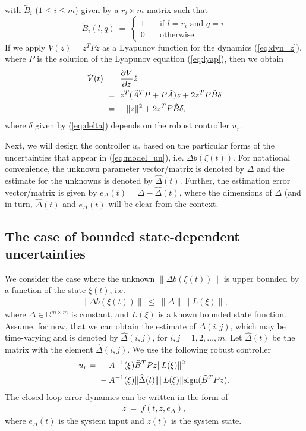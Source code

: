 \documentclass[twoside,leqno,onecolumn]{article}
\begin{document}
with $\tilde B_i$ ($1\leq i\leq m$) given by a $r_i\times m$ matrix such that
\[ \tilde{B}_i(l,q) ~=~ \left\{ \begin{array}{lll}
         1 & \quad\mbox{if $l = r_i$ and $q = i$}\\
         0  & \quad\mbox{otherwise}\end{array} \right. \]
If we apply $V(z)=z^TPz$ as a Lyapunov function for the dynamics
(\ref{eq:dyn_z}), where $P$ is the solution of the Lyapunov
equation (\ref{eq:lyap}), then we obtain
\begin{align}
\label{eq:general}
\dot{V}(t)&~=~\frac{\partial V}{\partial z}\dot{z}\notag\\
&~=~z^T(\tilde A^T P + P \tilde A)z + 2 z^T P \tilde B \delta\notag\\
&~=~-\|z\|^2 + 2 z^T P \tilde B \delta,
\end{align}
where $\delta$ given by (\ref{eq:delta}) depends on the robust controller $u_r$.

Next, we will design the controller $u_{r}$ based on the
particular forms of the uncertainties that appear in
(\ref{eq:model_un}), i.e. $\Delta b(\xi(t))$. For notational
convenience, the unknown parameter vector/matrix is denoted by
$\Delta$ and the estimate for the unknowns is denoted by
$\widehat{\Delta}(t)$. Further, the estimation error vector/matrix
is given by $e_\Delta(t) = \Delta-\widehat{\Delta}(t)$, where the
dimensions of $\Delta$ (and in turn, $\widehat{\Delta}(t)$ and
$e_\Delta(t)$ will be clear from the context.






\subsection{The case of bounded state-dependent uncertainties}
\label{sec:case2} We consider the case where the unknown $\|\Delta
b (\xi(t))\|$ is upper bounded by a function of the state
$\xi(t)$, i.e.
\begin{align}
\label{eq:upb} \|\Delta b(\xi(t))\|~\leq~\|\Delta\|\|L(\xi)\|,
\end{align}
where $\Delta\in\mathbb{R}^{m\times m}$ is constant, and $L(\xi)$
is a known bounded state function. Assume, for now, that we can
obtain the estimate of $\Delta(i,j)$, which may be time-varying
and is denoted by $\widehat{\Delta}(i,j)$, for $i,j =
1,2,\dots,m$. Let $\widehat{\Delta}(t)$
be the matrix with the element $\widehat{\Delta}(i,j)$.
We use the following robust controller
\begin{align}
\label{eq:case2}
u_{r}=&~-A^{-1}(\xi)\tilde B ^TP z\|L(\xi)\|^2 \notag\\
&~-A^{-1}(\xi) \|\widehat{\Delta}(t)\|\|L(\xi)\|{\rm{sign} }  (\tilde B ^TP z).
\end{align}
The closed-loop error dynamics can be written in the form of
\begin{align}
\label{eq:cl_case2}
\dot{z}~=~f(t,z,e_\Delta),
\end{align}
where $e_\Delta(t)$ is the system input and $z(t)$ is the system state.
\end{document}
